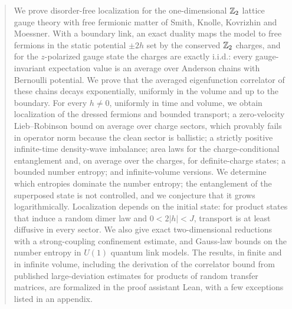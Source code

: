 \begin{abstract}
We prove disorder-free localization for the one-dimensional $\Z_2$ lattice gauge theory with free fermionic
matter of Smith, Knolle, Kovrizhin and Moessner.  With a boundary link, an exact duality maps the model to
free fermions in the static potential $\pm2h$ set by the conserved $\Z_2$ charges, and for the
$z$-polarized gauge state the charges are exactly i.i.d.: every gauge-invariant expectation value is an
average over Anderson chains with Bernoulli potential.  We prove that the averaged eigenfunction correlator
of these chains decays exponentially, uniformly in the volume and up to the boundary.  For every $h\neq0$,
uniformly in time and volume, we obtain localization of the dressed fermions and bounded transport; a
zero-velocity Lieb--Robinson bound on average over charge sectors, which provably fails in operator norm
because the clean sector is ballistic; a strictly positive infinite-time density-wave imbalance; area laws
for the charge-conditional entanglement and, on average over the charges, for definite-charge states; a
bounded number entropy; and
infinite-volume versions.  We determine which entropies dominate the number entropy; the entanglement of
the superposed state is not controlled, and we conjecture that it grows logarithmically.  Localization
depends on the initial state: for product states that induce a random dimer law and $0<2|h|<J$, transport
is at least diffusive in every sector.  We also give exact two-dimensional reductions with a
strong-coupling confinement estimate, and Gauss-law bounds on the number entropy in $U(1)$ quantum link
models.  The results, in finite and in infinite volume, including the derivation of the correlator bound from
published large-deviation estimates for products of random transfer matrices, are formalized in the proof
assistant Lean, with a few exceptions listed in an appendix.
\end{abstract}
